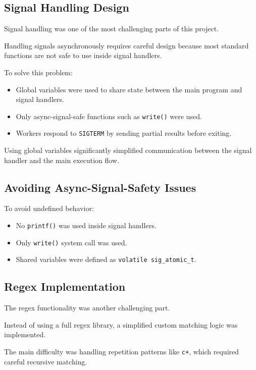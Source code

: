 \documentclass[12pt,a4paper]{article}
\begin{document}
\subsection{Signal Handling Design}

Signal handling was one of the most challenging parts of this project.

Handling signals asynchronously requires careful design because most standard 
functions are not safe to use inside signal handlers.

To solve this problem:

\begin{itemize}
    \item Global variables were used to share state between the main program and signal handlers.
    \item Only async-signal-safe functions such as \texttt{write()} were used.
    \item Workers respond to \texttt{SIGTERM} by sending partial results before exiting.
\end{itemize}

Using global variables significantly simplified communication between the signal 
handler and the main execution flow.

\subsection{Avoiding Async-Signal-Safety Issues}

To avoid undefined behavior:

\begin{itemize}
    \item No \texttt{printf()} was used inside signal handlers.
    \item Only \texttt{write()} system call was used.
    \item Shared variables were defined as \texttt{volatile sig\_atomic\_t}.
\end{itemize}

\subsection{Regex Implementation}

The regex functionality was another challenging part.

Instead of using a full regex library, a simplified custom matching logic was implemented.

The main difficulty was handling repetition patterns like \texttt{c+}, 
which required careful recursive matching.
\end{document}
